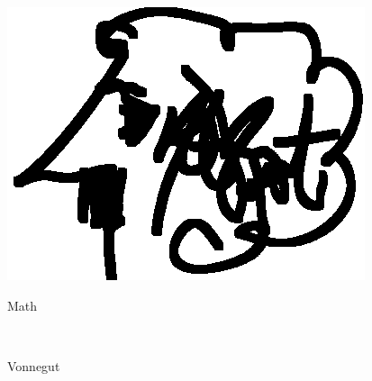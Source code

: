 \documentclass[12pt]{resume}
\begin{document}
\begin{minipage}[t]{0.48\textwidth}
\begin{spacing}{1.05}
\begin{minipage}[t]{0.1\textwidth}
        {\par \includegraphics[scale=.2]{vonnegut}}
    \end{minipage}
    \begin{minipage}[t]{0.38\textwidth}
        {\par \large Math }\\
        {\par \large Vonnegut }
    \end{minipage}
    \end{spacing}
    \end{minipage}
\end{document}
